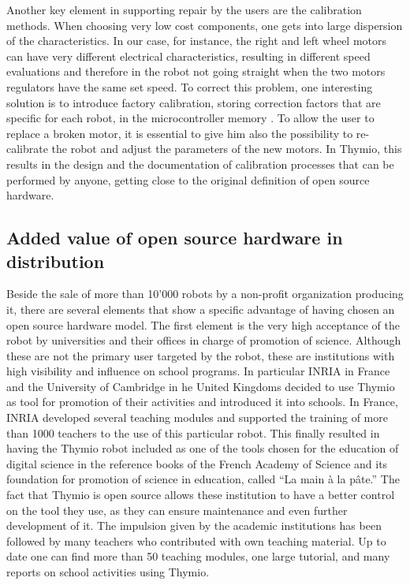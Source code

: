\documentclass[letterpaper, 10 pt, conference]{ieeeconf}  %
\begin{document}
Another key element in supporting repair by the users are the calibration methods. 
When choosing very low cost components, one gets into large dispersion of the characteristics. 
In our case, for instance, the right and left wheel motors can have very different electrical characteristics, resulting in different speed evaluations and therefore in the robot not going straight when the two motors regulators have the same set speed.
To correct this problem, one interesting solution is to introduce factory calibration, storing correction factors that are specific for each robot, in the microcontroller memory . 
To allow the user to replace a broken motor, it is essential to give him also the possibility to re-calibrate the robot and adjust the parameters of the new motors.
In Thymio, this results in the design and the documentation of calibration processes that can be performed by anyone, getting close to the original definition of open source hardware.

\subsection{Added value of open source hardware in distribution}

Beside the sale of more than 10'000 robots by a non-profit organization producing it, there are several elements that show a specific advantage of having chosen an open source hardware model.
The first element is the very high acceptance of the robot by universities and their offices in charge of promotion of science.
Although these are not the primary user targeted by the robot, these are institutions with high visibility and influence on school programs. 
In particular INRIA in France and the University of Cambridge in he United Kingdoms decided to use Thymio as tool for promotion of their activities and introduced it into schools.
In France, INRIA developed several teaching modules and supported the training of more than 1000 teachers to the use of this particular robot. 
This finally resulted in having the Thymio robot included as one of the tools chosen for the education of digital science in the reference books of the French Academy of Science and its foundation for promotion of science in education, called ``La main \`a la p\^ate.''
The fact that Thymio is open source allows these institution to have a better control on the tool they use, as they can ensure maintenance and even further development of it. 
The impulsion given by the academic institutions has been followed by many teachers who contributed with own teaching material. 
Up to date one can find more than 50 teaching modules, one large tutorial, and many reports on school activities using Thymio. 
\end{document}
